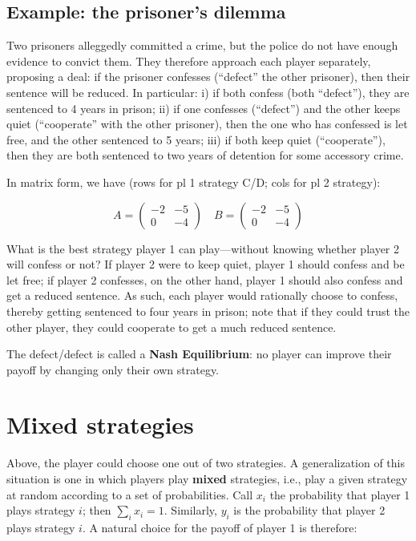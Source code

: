 \documentclass[]{book}
\begin{document}
\hypertarget{example-the-prisoners-dilemma}{%
\subsection{Example: the prisoner's dilemma}\label{example-the-prisoners-dilemma}}

Two prisoners alleggedly committed a crime, but the police do not have enough evidence to convict them. They therefore approach each player separately, proposing a deal: if the prisoner confesses (``defect'' the other prisoner), then their sentence will be reduced. In particular: i) if both confess (both ``defect''), they are sentenced to 4 years in prison; ii) if one confesses (``defect'') and the other keeps quiet (``cooperate'' with the other prisoner), then the one who has confessed is let free, and the other sentenced to 5 years; iii) if both keep quiet (``cooperate''), then they are both sentenced to two years of detention for some accessory crime.

In matrix form, we have (rows for pl 1 strategy C/D; cols for pl 2 strategy):

\[
A = \begin{pmatrix}
-2 & -5\\
0 & -4
\end{pmatrix} \quad
B = \begin{pmatrix}
-2 & -5\\
0 & -4
\end{pmatrix}
\]

What is the best strategy player 1 can play---without knowing whether player 2 will confess or not? If player 2 were to keep quiet, player 1 should confess and be let free; if player 2 confesses, on the other hand, player 1 should also confess and get a reduced sentence. As such, each player would rationally choose to confess, thereby getting sentenced to four years in prison; note that if they could trust the other player, they could cooperate to get a much reduced sentence.

The defect/defect is called a \textbf{Nash Equilibrium}: no player can improve their payoff by changing only their own strategy.

\hypertarget{mixed-strategies}{%
\section{Mixed strategies}\label{mixed-strategies}}

Above, the player could choose one out of two strategies. A generalization of this situation is one in which players play \textbf{mixed} strategies, i.e., play a given strategy at random according to a set of probabilities. Call \(x_i\) the probability that player 1 plays strategy \(i\); then \(\sum_i x_i = 1\). Similarly, \(y_i\) is the probability that player 2 plays strategy \(i\). A natural choice for the payoff of player 1 is therefore:
\end{document}
